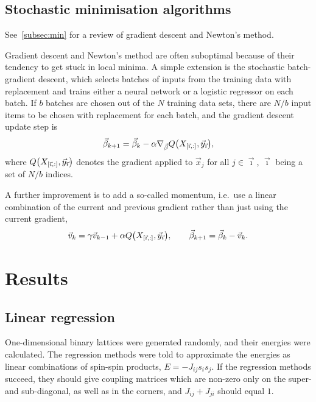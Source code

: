 \documentclass[11pt,british,a4paper]{article}
\numberwithin{equation}{section}
\begin{document}
\subsection{Stochastic minimisation algorithms}
See~\vref{subsec:min} for a review of gradient descent and Newton's method.

Gradient descent and Newton's method are often suboptimal because of their tendency to get stuck in local minima.
A simple extension is the stochastic batch-gradient descent, which selects batches of inputs from the training data with replacement and trains either a neural network or a logistic regressor on each batch. If \(b\) batches are chosen out of the \(N\) training data sets, there are \(N/b\) input items to be chosen with replacement for each batch, and the gradient descent update step is
\begin{equation}
    \vec{\beta}_{k+1} = \vec{\beta}_k - \alpha \nabla_{\vec{\beta}} Q\qty(X_{\qty[\vec{\imath},:]},\vec{y}_{\vec{\imath}}),
\end{equation}
where \(Q\qty(X_{\qty[\vec{\imath},:]},\vec{y}_{\vec{\imath}})\) denotes the gradient applied to \(\vec{x}_j\) for all \(j\in\vec{\imath}\), \(\vec{\imath}\) being a set of \(N/b\) indices.

A further improvement is to add a so-called momentum, i.e.\ use a linear combination of the current and previous gradient rather than just using the current gradient,
\begin{equation}
    \vec{v}_{k} = \gamma \vec{v}_{k-1} + \alpha Q\qty(X_{\qty[\vec{\imath},:]},\vec{y}_{\vec{\imath}}), \qquad
    \vec{\beta}_{k+1} = \vec{\beta}_k - \vec{v}_k.
\end{equation}

\section{Results}
\subsection{Linear regression}\label{subsec:linregresults}
One-dimensional binary lattices were generated randomly, and their energies were calculated.
The regression methods were told to approximate the energies as linear combinations of spin-spin products, \(E=-J_{ij}s_i s_j\).
If the regression methods succeed, they should give coupling matrices which are non-zero only on the super- and sub-diagonal, as well as in the corners, and \(J_{ij} + J_{ji}\) should equal \(1\).
\end{document}
